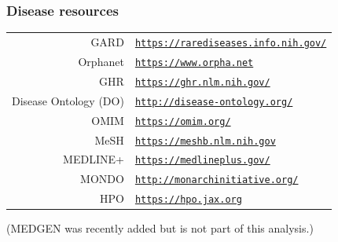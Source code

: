 ﻿\documentclass[anchorcolor=blue,linkcolor=blue]{beamer}
\begin{document}
\begin{frame}
  \frametitle{Disease resources}
  \begin{center}
    \begin{tabular}{rl}
      GARD &
      \href{https://rarediseases.info.nih.gov/}{\texttt{https://rarediseases.info.nih.gov/}}\\
      Orphanet &
      \href{https://www.orpha.net}{\texttt{https://www.orpha.net}}\\
      GHR&
      \href{https://ghr.nlm.nih.gov/}{\texttt{https://ghr.nlm.nih.gov/}}\\
      Disease Ontology (DO) &
      \href{http://disease-ontology.org/}{\texttt{http://disease-ontology.org/}}\\
      OMIM & \href{https://omim.org/}{\texttt{https://omim.org/}}\\
      MeSH &
      \href{https://meshb.nlm.nih.gov}{\texttt{https://meshb.nlm.nih.gov}}\\
      MEDLINE+ &
      \href{https://medlineplus.gov/}{\texttt{https://medlineplus.gov/}}\\
      MONDO &
      \href{http://monarchinitiative.org/}{\texttt{http://monarchinitiative.org/}}\\
      HPO & \href{https://hpo.jax.org}{\texttt{https://hpo.jax.org}}\\
    \end{tabular}
  \end{center}
  (MEDGEN was recently added but is not part of this analysis.)
\end{frame}
\end{document}
